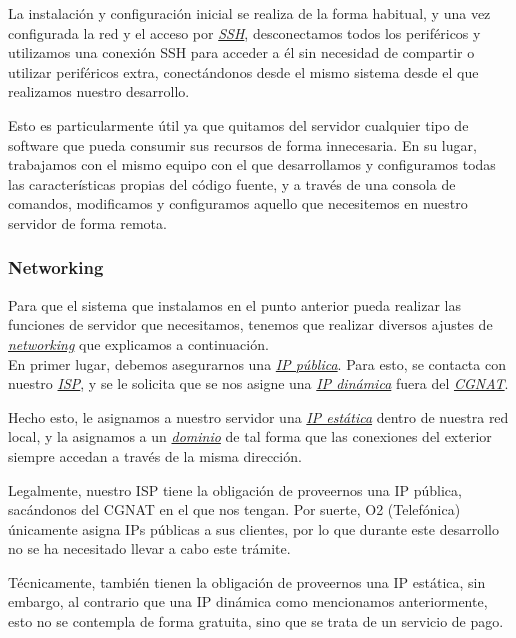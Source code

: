 \documentclass{article}
\begin{document}
La instalación y configuración inicial se realiza de la forma habitual, y una vez configurada la red y el acceso por \hyperref[sec:terms]{\textit{SSH}\tec}, desconectamos todos los periféricos y utilizamos una conexión SSH para acceder a él sin necesidad de compartir o utilizar periféricos extra, conectándonos desde el mismo sistema desde el que realizamos nuestro desarrollo.

Esto es particularmente útil ya que quitamos del servidor cualquier tipo de software que pueda consumir sus recursos de forma innecesaria. En su lugar, trabajamos con el mismo equipo con el que desarrollamos y configuramos todas las características propias del código fuente, y a través de una consola de comandos, modificamos y configuramos aquello que necesitemos en nuestro servidor de forma remota.

\subsubsection{Networking}
Para que el sistema que instalamos en el punto anterior pueda realizar las funciones de servidor que necesitamos, tenemos que realizar diversos ajustes de \hyperref[sec:terms]{\textit{networking}\tec} que explicamos a continuación.\\

En primer lugar, debemos asegurarnos una \hyperref[sec:terms]{\textit{IP pública}\tec}. Para esto, se contacta con nuestro \hyperref[sec:terms]{\textit{ISP}\tec}, y se le solicita que se nos asigne una \hyperref[sec:terms]{\textit{IP dinámica}\tec} fuera del \hyperref[sec:terms]{\textit{CGNAT}\tec}.

Hecho esto, le asignamos a nuestro servidor una \hyperref[sec:terms]{\textit{IP estática}\tec} dentro de nuestra red local, y la asignamos a un \hyperref[sec:terms]{\textit{dominio}\tec} de tal forma que las conexiones del exterior siempre accedan a través de la misma dirección.

Legalmente, nuestro ISP tiene la obligación de proveernos una IP pública, sacándonos del CGNAT en el que nos tengan. Por suerte, O2 (Telefónica) únicamente asigna IPs públicas a sus clientes, por lo que durante este desarrollo no se ha necesitado llevar a cabo este trámite.

Técnicamente, también tienen la obligación de proveernos una IP estática, sin embargo, al contrario que una IP dinámica como mencionamos anteriormente, esto no se contempla de forma gratuita, sino que se trata de un servicio de pago.
\end{document}
